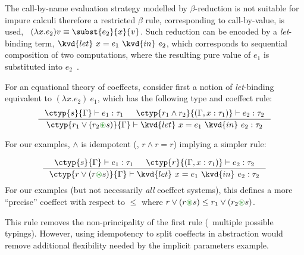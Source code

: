 The call-by-name evaluation strategy modelled by $\beta$-reduction is
not suitable for impure calculi therefore a restricted $\beta$ rule,
corresponding to call-by-value, is used, \ie~$(\lambda x . e_2) v
\equiv \subst{e_2}{x}{v}$. Such reduction can be encoded by a
\emph{let}-binding term, $\kvd{let}~x=e_1~\kvd{in}~e_2$, which
corresponds to sequential composition of two computations, where the
resulting pure value of $e_1$ is substituted into
$e_2$~\cite{monads-inaction,monad-notions}.

%
% 

For an equational theory of coeffects, consider first a notion 
of \emph{let}-binding equivalent to $(\lambda x . e_2)~e_1$, which
has the following type and coeffect rule:
%
\begin{equation}
\inference
  {\ctyp{s}{\Gamma} \vdash e_1 : \tau_1 &
   \ctyp{r_1 \wedge r_2}{(\Gamma, x : \tau_1)} \vdash e_2 : \tau_2}
  {\ctyp{r_1 \vee (r_2 \cseq s)}{\Gamma} \vdash \kvd{let}~x = e_1~\kvd{in}~e_2
: \tau_2 }
\label{eq:let1}
\end{equation}

\noindent
For our examples, $\wedge$ is idempotent (\ie{}, $r \wedge r = r$)
implying a simpler rule:

%
\begin{equation}
\inference
  {\ctyp{s}{\Gamma} \vdash e_1 : \tau_1 &
   \ctyp{r}{(\Gamma, x : \tau_1)} \vdash e_2 : \tau_2}
  {\ctyp{r \vee (r \cseq s)}{\Gamma} \vdash \kvd{let}~x = e_1~\kvd{in}~e_2 : \tau_2 }
\label{eq:let2}
\end{equation}
For our examples (but not necessarily \emph{all} coeffect
systems), this defines a more ``precise'' coeffect with respect to $\leq$
where $r \vee (r \cseq s) \leq r_1 \vee (r_2 \cseq s)$.

This rule removes the non-principality of the first rule
(\ie~multiple possible typings).  However, using idempotency 
to split coeffects in abstraction would remove additional
flexibility needed by the implicit parameters example.

